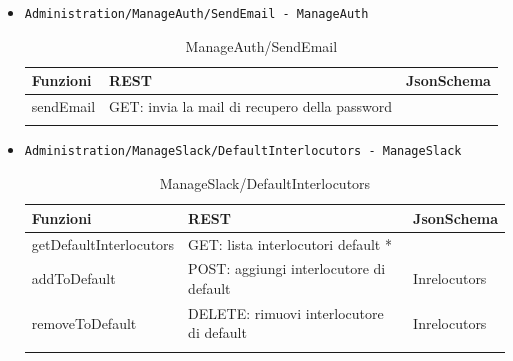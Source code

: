 \documentclass[../DefinizioneDiProdotto_v2.0.0.tex]{subfiles}
\begin{document}
\begin{itemize}
	\item \texttt{Administration/ManageAuth/SendEmail - ManageAuth}
	      \begin{longtable}[c] { >{\centering\arraybackslash}p{4cm} >{\centering\arraybackslash}p{6cm} >{\centering\arraybackslash}p{3cm}}
	      	\toprule
	      	\centerline{\textbf{Funzioni}} & \centerline{\textbf{REST}}                    & \centerline{\textbf{JsonSchema}} \\
	      	\midrule
	      	sendEmail                      & GET: invia la mail di recupero della password &                                  \\
	      	\bottomrule
	      	\caption{ManageAuth/SendEmail}
	      \end{longtable}

	\item \texttt{Administration/ManageSlack/DefaultInterlocutors - ManageSlack}
	      \begin{longtable}[c] { >{\centering\arraybackslash}p{4cm} >{\centering\arraybackslash}p{6cm} >{\centering\arraybackslash}p{3cm}}
	      	\toprule
	      	\centerline{\textbf{Funzioni}} & \centerline{\textbf{REST}}               & \centerline{\textbf{JsonSchema}} \\
	      	\midrule
	      	getDefaultInterlocutors        & GET: lista interlocutori default *       &                                  \\
	      	\addlinespace[0.3em]
	      	\midrule
	      	\addlinespace[0.3em]
	      	addToDefault                   & POST: aggiungi interlocutore di default  & Inrelocutors                     \\
	      	\addlinespace[0.3em]
	      	\midrule
	      	\addlinespace[0.3em]
	      	removeToDefault                & DELETE: rimuovi interlocutore di default & Inrelocutors                     \\
	      	\bottomrule
	      	\caption{ManageSlack/DefaultInterlocutors}
	      \end{longtable}


\end{itemize}
\end{document}

